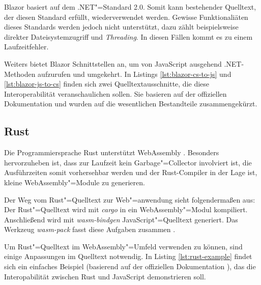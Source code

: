 Blazor basiert auf dem .NET"=Standard 2.0. Somit kann bestehender Quelltext, der diesen Standard erfüllt, wiederverwendet werden. Gewisse Funktionaliäten dieses Standards werden jedoch nicht unterstützt, dazu zählt beispielsweise direkter Dateisystemzugriff und \emph{Threading}. In diesen Fällen kommt es zu einem Laufzeitfehler.

Weiters bietet Blazor Schnittstellen an, um von JavaScript ausgehend .NET-Methoden aufzurufen und umgekehrt. In Listings \ref{lst:blazor-cs-to-js} und \ref{lst:blazor-js-to-cs} finden sich zwei Quelltextausschnitte, die diese Interoperabilität veranschaulichen sollen. Sie basieren auf der offiziellen Dokumentation und wurden auf die wesentlichen Bestandteile zusammengekürzt.

\pagebreak




\subsection{Rust}

Die Programmiersprache Rust unterstützt WebAssembly \cite{RustWasmWebsite}. Besonders hervorzuheben ist, dass zur Laufzeit kein Garbage"=Collector involviert ist, die Ausführzeiten somit vorhersehbar werden und der Rust-Compiler in der Lage ist, kleine WebAssembly"=Module zu generieren.

Der Weg vom Rust"=Quelltext zur Web"=anwendung sieht folgendermaßen aus: Der Rust"=Quelltext wird mit \emph{cargo} in ein WebAssembly"=Modul kompiliert. Anschließend wird mit \emph{wasm-bindgen} JavaScript"=Quelltext generiert. Das Werkzeug \emph{wasm-pack} fasst diese Aufgaben zusammen \cite{RustWasmBook}.

Um Rust"=Quelltext im WebAssembly"=Umfeld verwenden zu können, sind einige Anpassungen im Quelltext notwendig. In Listing \ref{lst:rust-example} findet sich ein einfaches Beispiel (basierend auf der offiziellen Dokumentation \cite{RustWasmBook}), das die Interopabilität zwischen Rust und JavaScript demonstrieren soll.



